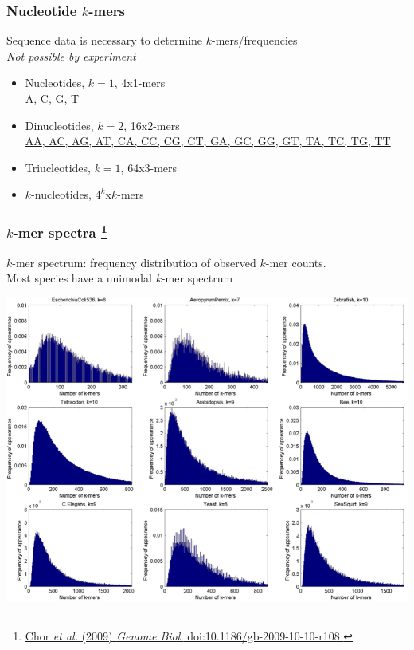 %
\begin{frame}
  \frametitle{Nucleotide $k$-mers}
  Sequence data is necessary to determine $k$-mers/frequencies \\
  \textit{Not possible by experiment}
  \begin{itemize}
    \item \textcolor{hutton_green}{Nucleotides, $k=1$, 4x1-mers} \\
      \url{A, C, G, T}
    \item \textcolor{hutton_blue}{Dinucleotides, $k=2$, 16x2-mers} \\
      \url{AA, AC, AG, AT, CA, CC, CG, CT, GA, GC, GG, GT, TA, TC, TG, TT}
    \item \textcolor{RawSienna}{Triucleotides, $k=1$, 64x3-mers}
    \item \textcolor{hutton_purple}{$k$-nucleotides, $4^k$x$k$-mers}
  \end{itemize}  
\end{frame}

%
\begin{frame}
  \frametitle{$k$-mer spectra
  \footnote{\tiny{\href{http://dx.doi.org/10.1186/gb-2009-10-10-r108
}{Chor \textit{et al.} (2009) \textit{Genome Biol.} doi:10.1186/gb-2009-10-10-r108
}}}
  }
  \textcolor{RawSienna}{$k$-mer spectrum: frequency distribution of observed $k$-mer counts.} \\
  Most species have a unimodal $k$-mer spectrum
  \begin{center}
    \includegraphics[height=0.6\textheight]{images/kmer_spectra} \\
  \end{center}  
\end{frame}

